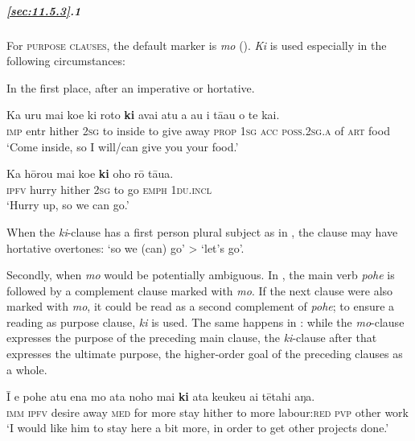 \subparagraph{\ref{sec:11.5.3}.1} For \textsc{purpose clauses}, the default marker is \textit{mo} (). \textit{Ki} is used especially in the following circumstances:

In the first place, after an imperative or hortative. 

\ea\label{ex:11.186}
\gll Ka uru mai koe ki roto \textbf{ki} {\ꞌ}avai atu a au i tā{\ꞌ}au o te kai. \\
\textsc{imp} entr hither \textsc{2sg} to inside to give away \textsc{prop} \textsc{1sg} \textsc{acc} \textsc{poss.2sg.a} of \textsc{art} food \\

\glt 
‘Come inside, so I will/can give you your food.’ \textstyleExampleref{[R229.417]} 
\z

\ea\label{ex:11.187}
\gll Ka hōrou mai koe \textbf{ki} oho rō tāua. \\
\textsc{ipfv} hurry hither \textsc{2sg} to go \textsc{emph} \textsc{1du.incl} \\

\glt
‘Hurry up, so we can go.’ \textstyleExampleref{[R313.109]} 
\z

When the \textit{ki}{}-clause has a first person plural subject as in , the clause may have hortative overtones: ‘so we (can) go’ {\textgreater} ‘let’s go’.

Secondly, when \textit{mo} would be potentially ambiguous. In , the main verb \textit{pohe} is followed by a complement clause marked with \textit{mo}. If the next clause were also marked with \textit{mo}, it could be read as a second complement of \textit{pohe}; to ensure a reading as purpose clause, \textit{ki} is used. The same happens in : while the \textit{mo}{}-clause expresses the purpose of the preceding main clause, the \textit{ki}{}-clause after that expresses the ultimate purpose, the higher-order goal of the preceding clauses as a whole.

\ea\label{ex:11.188}
\gll {\ꞌ}Ī e pohe atu ena mo {\ꞌ}ata noho mai \textbf{ki} {\ꞌ}ata keukeu ai tētahi aŋa.\\
\textsc{imm} \textsc{ipfv} desire away \textsc{med} for more stay hither to more labour:\textsc{red} \textsc{pvp} other work\\

\glt 
‘I would like him to stay here a bit more, in order to get other projects done.’ \textstyleExampleref{[R204.005]} 
\z

